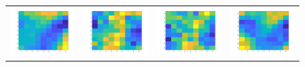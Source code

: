 \documentclass{article} %
\begin{document}
\begin{figure}[H]
\begin{tabular}{cccc}
\\
\includegraphics[width=0.2\linewidth]{images/Fig_weights_17.png}
&
\includegraphics[width=0.2\linewidth]{images/Fig_weights_18.png}
&
\includegraphics[width=0.2\linewidth]{images/Fig_weights_19.png}
&
\includegraphics[width=0.2\linewidth]{images/Fig_weights_20.png}
\end{tabular}
\end{figure}
\end{document}
